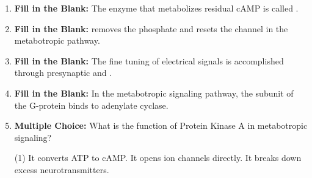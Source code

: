 \begin{enumerate}[label=\textbf{Q2.5.\arabic*}]
      \item \textbf{Fill in the Blank:} The enzyme that metabolizes residual cAMP is called . \\
            
      \item \textbf{Fill in the Blank:}  removes the phosphate and resets the channel in the metabotropic pathway. \\

      \item \textbf{Fill in the Blank:} The fine tuning of electrical signals is accomplished through presynaptic  and . \\

      \item \textbf{Fill in the Blank:} In the metabotropic signaling pathway, the  subunit of the G-protein binds to adenylate cyclase. \\
            
      \item \textbf{Multiple Choice:} What is the function of Protein Kinase A in metabotropic signaling?
            \begin{tasks}[label=\textcolor{draculafg}{(\Alph*)}, item-format=\color{draculafg}, label-width=1.5em, item-indent=1.7em](1)
                  \task {}
                  \task It converts ATP to cAMP.
                  \task It opens ion channels directly.
                  \task It breaks down excess neurotransmitters.
            \end{tasks}
            
\newpage
      

\end{enumerate}
